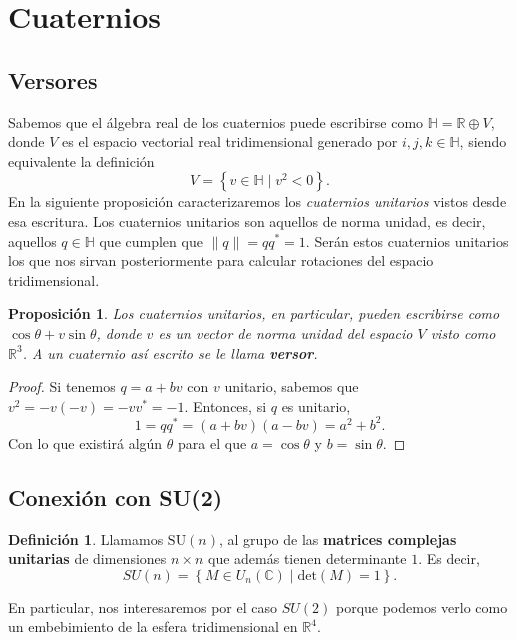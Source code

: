 \documentclass{article}
\theoremstyle{plain}
\newtheorem{proposition}{Proposición}
\theoremstyle{definition}
\newtheorem{definition}{Definición}
\theoremstyle{remark}
\begin{document}
\section{Cuaternios}
\subsection{Versores}
Sabemos que el álgebra real de los cuaternios puede escribirse como
$\mathbb{H} = \mathbb{R} \oplus V$, donde $V$ es el espacio vectorial
real tridimensional generado por $i,j,k \in \mathbb{H}$, siendo equivalente la
definición
\[
  V = \left\{ v \in \mathbb{H} \mid v^2 < 0 \right\}.
\]
En la siguiente proposición caracterizaremos los \textit{cuaternios unitarios}
vistos desde esa escritura. Los cuaternios unitarios son aquellos de norma
unidad, es decir, aquellos $q \in \mathbb{H}$ que cumplen que
$\|q\| = qq^\ast = 1$. Serán estos cuaternios unitarios los que nos sirvan
posteriormente para calcular rotaciones del espacio tridimensional.

\begin{proposition}
Los cuaternios unitarios, en particular, pueden escribirse como
$\cos \theta + v \sin \theta$, donde $v$ es un vector de norma unidad del
espacio $V$ visto como $\mathbb{R}^3$. A un cuaternio así escrito se le llama
\textbf{versor}.
\end{proposition}
\begin{proof}
  Si tenemos $q = a + bv$ con $v$ unitario, sabemos que $v^2 = - v(-v) = - vv^\ast = -1$.
  Entonces, si $q$ es unitario,
  \[
    1 = qq^\ast = (a+bv)(a-bv) = a^2 + b^2.
  \]
  Con lo que existirá algún $\theta$ para el que $a = \cos \theta$ y $b = \sin \theta$.
\end{proof}

\subsection{Conexión con SU(2)}
\cite{gelfand63}

\begin{definition}
  Llamamos $\mathrm{SU}(n)$, al grupo de las \textbf{matrices complejas unitarias} de dimensiones
  $n \times n$ que además tienen determinante $1$. Es decir,
  \[SU(n) = \left\{ M \in U_n(\mathbb{C}) \mid \mathrm{det}(M) = 1 \right\}.\]
\end{definition}

En particular, nos interesaremos por el caso $SU(2)$ porque podemos
verlo como un embebimiento de la esfera tridimensional en
$\mathbb{R}^4$.
\end{document}
